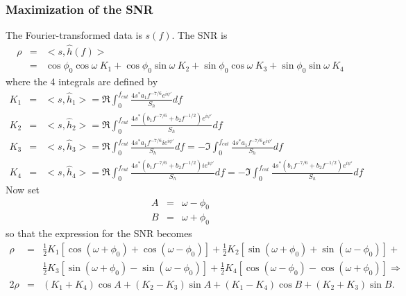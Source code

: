 \subsubsection*{Maximization of the SNR}
\label{SNRMaximization}

The Fourier-transformed data is $s(f)$. The SNR is
\begin{eqnarray}
\rho &=& <s,\hat{h}(f)> \\  
     &=& \cos\phi_0 \cos\omega \: K_1 + 
             \cos\phi_0 \sin\omega \: K_2+ 
             \sin\phi_0 \cos\omega \: K_3 +
             \sin\phi_0 \sin\omega \: K_4
\end{eqnarray}
where the 4 integrals are defined by
\begin{eqnarray}
\label{K1}
K_1 &=& <s,\hat{h}_1>  = \Re \int_0^{f_{cut}} \frac{4 s^{\ast} a_1 f^{-7/6}
	e^{i \psi'}}{S_h} df \\ \label{K2}
K_2 &=& <s,\hat{h}_2>  = \Re \int_0^{f_{cut}} \frac{4 s^{\ast} (b_1 f^{-7/6}
         + b_2 f^{-1/2} ) e^{i \psi'}}{S_h} df \\ \label{K3}
K_3 &=& <s,\hat{h}_3>  = \Re \int_0^{f_{cut}} \frac{4 s^{\ast} a_1 f^{-7/6} i
        e^{i \psi'}}{S_h} df 
	= -\Im \int_0^{f_{cut}} \frac{4 s^{\ast} a_1 f^{-7/6} e^{i \psi'}}{S_h}
	df  \\ \label{K4}
K_4 &=& <s,\hat{h}_4>  = \Re \int_0^{f_{cut}} \frac{4 s^{\ast} (b_1 f^{-7/6}
	+ b_2 f^{-1/2} ) i e^{i \psi'}}{S_h} df 
	= -\Im \int_0^{f_{cut}} \frac{4 s^{\ast} (b_1 f^{-7/6} + b_2 f^{-1/2})
	e^{i \psi'}}{S_h} df 
\end{eqnarray}
Now set
\begin{eqnarray}
\label{OmegaMinusPhi}
A &=& \omega - \phi_0 \\
B &=& \omega + \phi_0 \label{OmegaPlusPhi}
\end{eqnarray}
so that the expression for the SNR becomes
\begin{eqnarray}
\rho &=& \frac{1}{2} K_1 [\cos(\omega+\phi_0)+\cos(\omega-\phi_0)] +
	\frac{1}{2} K_2 [\sin(\omega+\phi_0)+\sin(\omega-\phi_0)] +\\
	&& \frac{1}{2} K_3[\sin(\omega+\phi_0)-\sin(\omega-\phi_0)]
	+\frac{1}{2} K_4 [\cos(\omega-\phi_0)-\cos(\omega+\phi_0)]\Rightarrow\\
2 \rho &=& (K_1+K_4) \cos A + (K_2-K_3) \sin A + (K_1-K_4) \cos B + (K_2+K_3)
\sin B.
\label{MaxSNR}
\end{eqnarray}

